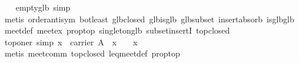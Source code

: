 \begin{isabellebody}
\endisatagproof
{\isafoldproof}%
%
\isadelimproof
\isanewline
%
\endisadelimproof
\isanewline
\ \ \isamarkupfalse%
\ empty{}glb\ {}simp{}{}\ {}{}\ {}{}\ {}\ {}{}\isanewline
%
\isadelimproof
\ \ \ \ %
\endisadelimproof
%
\isatagproof
{}\isamarkupfalse%
\ {}metis\ order{}antisym\ bot{}least\ glb{}closed\ glb{}is{}glb\ glb{}subset\ insert{}absorb{}\ is{}glb{}glb\ meet{}def\ meet{}ex\ prop{}top\ singleton{}glb\ subset{}insertI\ top{}closed{}%
\endisatagproof
{\isafoldproof}%
%
\isadelimproof
\isanewline
%
\endisadelimproof
\isanewline
\ \ \isamarkupfalse%
\ top{}oner\ {}simp{}{}\ {}{}x\ {}\ carrier\ A{}\ {}\ x\ {}\ {}\ {}\ x{}\isanewline
%
\isadelimproof
\ \ \ \ %
\endisadelimproof
%
\isatagproof
{}\isamarkupfalse%
\ {}metis\ meet{}comm\ top{}closed\ leq{}meet{}def\ prop{}top{}%

\end{isabellebody}
